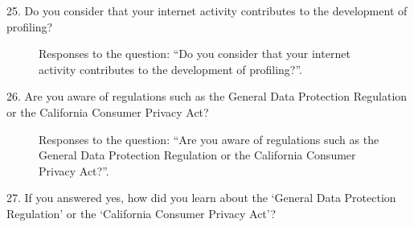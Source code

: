 25. Do you consider that your internet activity contributes to the development of profiling?

\begin{figure}[H]
    \centering
    \caption{Responses to the question: ``Do you consider that your internet activity contributes to the development of profiling?''.}
    \label{fig:survey_s2_q25}
\end{figure}

26. Are you aware of regulations such as the General Data Protection Regulation or the California Consumer Privacy Act?

\begin{figure}[H]
    \begin{center}
        \caption{Responses to the question: ``Are you aware of regulations such as the General Data Protection Regulation or the California Consumer Privacy Act?''.}
        \label{fig:survey_s1_q26}
    \end{center}
\end{figure}

27. If you answered yes, how did you learn about the `General Data Protection Regulation' or the `California Consumer Privacy Act'?

